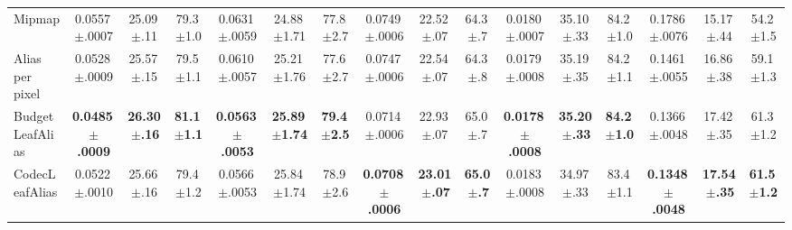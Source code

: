 \begin{table}[t]
{\begin{tabular}{l ccc ccc ccc ccc ccc}
Mipmap & 0.0557\,{\scriptsize$\pm$.0007} & 25.09\,{\scriptsize$\pm$.11} & 79.3\,{\scriptsize$\pm$1.0} & 0.0631\,{\scriptsize$\pm$.0059} & 24.88\,{\scriptsize$\pm$1.71} & 77.8\,{\scriptsize$\pm$2.7} & 0.0749\,{\scriptsize$\pm$.0006} & 22.52\,{\scriptsize$\pm$.07} & 64.3\,{\scriptsize$\pm$.7} & 0.0180\,{\scriptsize$\pm$.0007} & 35.10\,{\scriptsize$\pm$.33} & 84.2\,{\scriptsize$\pm$1.0} & 0.1786\,{\scriptsize$\pm$.0076} & 15.17\,{\scriptsize$\pm$.44} & 54.2\,{\scriptsize$\pm$1.5} \\
Alias per pixel & 0.0528\,{\scriptsize$\pm$.0009} & 25.57\,{\scriptsize$\pm$.15} & 79.5\,{\scriptsize$\pm$1.1} & 0.0610\,{\scriptsize$\pm$.0057} & 25.21\,{\scriptsize$\pm$1.76} & 77.6\,{\scriptsize$\pm$2.7} & 0.0747\,{\scriptsize$\pm$.0006} & 22.54\,{\scriptsize$\pm$.07} & 64.3\,{\scriptsize$\pm$.8} & 0.0179\,{\scriptsize$\pm$.0008} & 35.19\,{\scriptsize$\pm$.35} & 84.2\,{\scriptsize$\pm$1.1} & 0.1461\,{\scriptsize$\pm$.0055} & 16.86\,{\scriptsize$\pm$.38} & 59.1\,{\scriptsize$\pm$1.3} \\
BudgetLeafAlias & \textbf{0.0485\,{\scriptsize$\pm$.0009}} & \textbf{26.30\,{\scriptsize$\pm$.16}} & \textbf{81.1\,{\scriptsize$\pm$1.1}} & \textbf{0.0563\,{\scriptsize$\pm$.0053}} & \textbf{25.89\,{\scriptsize$\pm$1.74}} & \textbf{79.4\,{\scriptsize$\pm$2.5}} & 0.0714\,{\scriptsize$\pm$.0006} & 22.93\,{\scriptsize$\pm$.07} & 65.0\,{\scriptsize$\pm$.7} & \textbf{0.0178\,{\scriptsize$\pm$.0008}} & \textbf{35.20\,{\scriptsize$\pm$.33}} & \textbf{84.2\,{\scriptsize$\pm$1.0}} & 0.1366\,{\scriptsize$\pm$.0048} & 17.42\,{\scriptsize$\pm$.35} & 61.3\,{\scriptsize$\pm$1.2} \\
CodecLeafAlias & 0.0522\,{\scriptsize$\pm$.0010} & 25.66\,{\scriptsize$\pm$.16} & 79.4\,{\scriptsize$\pm$1.2} & 0.0566\,{\scriptsize$\pm$.0053} & 25.84\,{\scriptsize$\pm$1.74} & 78.9\,{\scriptsize$\pm$2.6} & \textbf{0.0708\,{\scriptsize$\pm$.0006}} & \textbf{23.01\,{\scriptsize$\pm$.07}} & \textbf{65.0\,{\scriptsize$\pm$.7}} & 0.0183\,{\scriptsize$\pm$.0008} & 34.97\,{\scriptsize$\pm$.33} & 83.4\,{\scriptsize$\pm$1.1} & \textbf{0.1348\,{\scriptsize$\pm$.0048}} & \textbf{17.54\,{\scriptsize$\pm$.35}} & \textbf{61.5\,{\scriptsize$\pm$1.2}} \\
\bottomrule
\end{tabular}}
\end{table}
